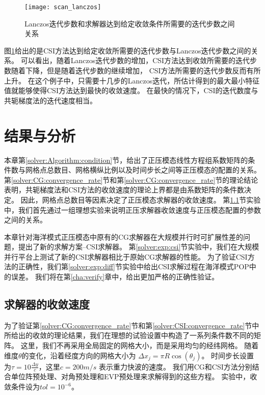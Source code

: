 \begin {figure}%
\centering
\texttt{[image: scan\_lanczos]}
\caption[] {Lanczos迭代步数和求解器达到给定收敛条件所需要的迭代步数之间关系\label{fig:lanczos_iter}}
\end{figure}
图\ref{fig:lanczos_iter}给出的是CSI方法达到给定收敛所需要的迭代步数与Lanczos迭代步数之间的关系。
可以看出，随着Lanczos迭代步数的增加，CSI方法达到收敛所需要的迭代步数随着下降，但是随着迭代步数的继续增加， CSI方法所需要的迭代步数反而有所上升。 
在这个例子中，只需要十几步的Lanczos迭代，所估计得到的最大最小特征值就能够使得CSI方法达到最快的收敛速度。
在最快的情况下，CSI的迭代数度与共轭梯度法的迭代速度相当。





\section{结果与分析} 
\label{solver:exp}

本章第\ref{solver:Algorithm:condition}节，给出了正压模态线性方程组系数矩阵的条件数与网格点总数目、网格横纵比例以及时间步长之间等正压模态的配置的关系。
第\ref{solver:CG:convergence_rate}节和第\ref{solver:CG:convergence_rate}节的理论结论表明，共轭梯度法和CSI方法的收敛速度的理论上界都是由系数矩阵的条件数决定。
因此，网格点总数目等因素决定了正压模态求解器的收敛速度。
第\ref{solver:exp:ideal}节实验中，我们首先通过一组理想实验来说明正压求解器收敛速度与正压模态配置的参数之间的关系。 

本章针对海洋模式正压模态中原有的CG求解器在大规模并行时可扩展性差的问题，提出了新的求解方案--CSI求解器。
第\ref{solver:exp:csi}节实验中，我们在大规模并行平台上测试了新的CSI求解器相比于原始CG求解器的性能。
为了验证CSI方法的正确性，我们第\ref{solver:exp:diff}节实验中给出CSI求解过程在海洋模式POP中的误差。
我们将在第\ref{cha:verify}章中，给出更加严格的正确性验证。 



\subsection{求解器的收敛速度}\label{solver:exp:ideal}

为了验证第\ref{solver:CG:convergence_rate}节和第\ref{solver:CSI:convergence_rate}节中所给出的收敛的理论结果，我们在理想的试验设置中构造了一系列条件数不同的矩阵。
这里，我们不再采用全局固定的网格大小，而是采用均匀的经纬网格。
随着维度$\theta$的变化，沿着经度方向的网格大小为 $\Delta x_j  = \pi R \cos (\theta_j)$。
时间步长设置为$\tau = 10\frac{\Delta y}{c}$，这里$c = 200m/s$ 表示重力快波的速度\cite{smith2010parallel}。 
我们用CG和CSI方法分别结合单位阵预处理、对角预处理和EVP预处理来求解得到的这些方程。
实验中，收敛条件设为$tol = 10^{-6}$。 
  

